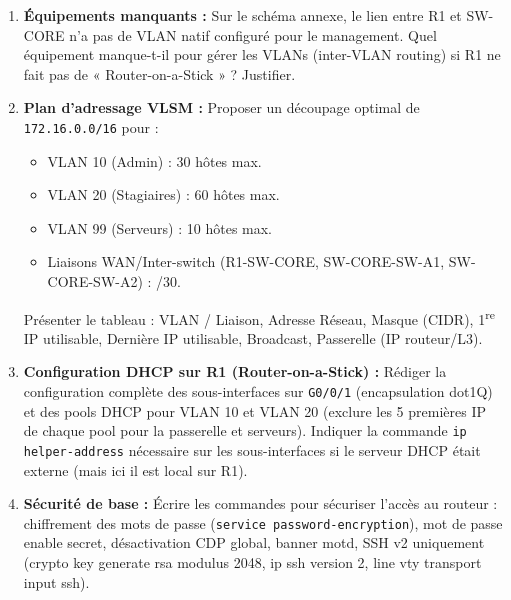 \documentclass[11pt]{article}
\begin{document}
\begin{exoresolu}
\begin{enumerate}
    \item \textbf{Équipements manquants :} Sur le schéma annexe, le lien entre R1 et SW-CORE n'a pas de VLAN natif configuré pour le management. Quel équipement manque-t-il pour gérer les VLANs (inter-VLAN routing) si R1 ne fait pas de « Router-on-a-Stick » ? Justifier.
    \item \textbf{Plan d'adressage VLSM :} Proposer un découpage optimal de \texttt{172.16.0.0/16} pour :
    \begin{itemize}
        \item VLAN 10 (Admin) : 30 hôtes max.
        \item VLAN 20 (Stagiaires) : 60 hôtes max.
        \item VLAN 99 (Serveurs) : 10 hôtes max.
        \item Liaisons WAN/Inter-switch (R1-SW-CORE, SW-CORE-SW-A1, SW-CORE-SW-A2) : /30.
    \end{itemize}
    Présenter le tableau : VLAN / Liaison, Adresse Réseau, Masque (CIDR), 1\textsuperscript{re} IP utilisable, Dernière IP utilisable, Broadcast, Passerelle (IP routeur/L3).
    \item \textbf{Configuration DHCP sur R1 (Router-on-a-Stick) :} Rédiger la configuration complète des sous-interfaces sur \texttt{G0/0/1} (encapsulation dot1Q) et des pools DHCP pour VLAN 10 et VLAN 20 (exclure les 5 premières IP de chaque pool pour la passerelle et serveurs). Indiquer la commande \texttt{ip helper-address} nécessaire sur les sous-interfaces si le serveur DHCP était externe (mais ici il est local sur R1).
    \item \textbf{Sécurité de base :} Écrire les commandes pour sécuriser l'accès au routeur : chiffrement des mots de passe (\texttt{service password-encryption}), mot de passe enable secret, désactivation CDP global, banner motd, SSH v2 uniquement (crypto key generate rsa modulus 2048, ip ssh version 2, line vty transport input ssh).
\end{enumerate}
\end{exoresolu}
\end{document}
